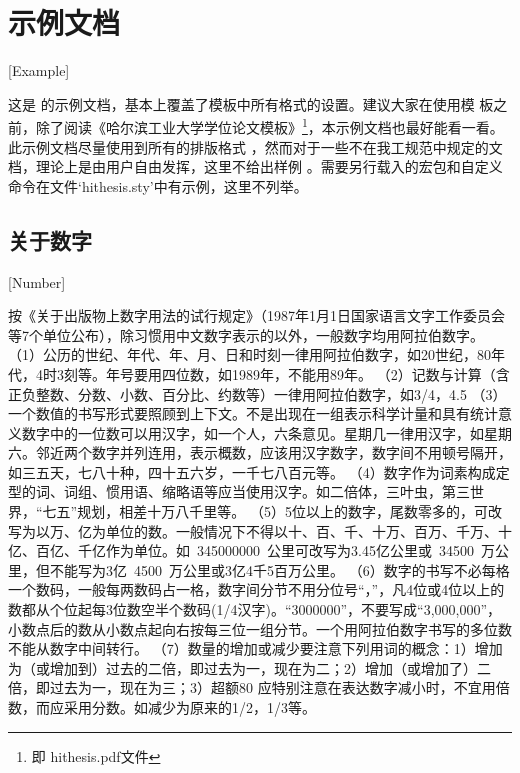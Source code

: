 
\chapter{示例文档}[Example]

这是 \hithesis{}的示例文档，基本上覆盖了模板中所有格式的设置。建议大家在使用模
板之前，除了阅读《\hithesis\:哈尔滨工业大学学位论文模板》\footnote{即
hithesis.pdf文件}，本示例文档也最好能看一看。此示例文档尽量使用到所有的排版格式
，然而对于一些不在我工规范中规定的文档，理论上是由用户自由发挥，这里不给出样例
。需要另行载入的宏包和自定义命令在文件`hithesis.sty'中有示例，这里不列举。

\section{关于数字}[Number]

按《关于出版物上数字用法的试行规定》（1987年1月1日国家语言文字工作委员会等7个单位公布），除习惯用中文数字表示的以外，一般数字均用阿拉伯数字。
（1）公历的世纪、年代、年、月、日和时刻一律用阿拉伯数字，如20世纪，80年代，4时3刻等。年号要用四位数，如1989年，不能用89年。
（2）记数与计算（含正负整数、分数、小数、百分比、约数等）一律用阿拉伯数字，如3/4，4.5%
（3）一个数值的书写形式要照顾到上下文。不是出现在一组表示科学计量和具有统计意义数字中的一位数可以用汉字，如一个人，六条意见。星期几一律用汉字，如星期六。邻近两个数字并列连用，表示概数，应该用汉字数字，数字间不用顿号隔开，如三五天，七八十种，四十五六岁，一千七八百元等。
（4）数字作为词素构成定型的词、词组、惯用语、缩略语等应当使用汉字。如二倍体，三叶虫，第三世界，“七五”规划，相差十万八千里等。
（5）5位以上的数字，尾数零多的，可改写为以万、亿为单位的数。一般情况下不得以十、百、千、十万、百万、千万、十亿、百亿、千亿作为单位。如~\num{345000000}~公里可改写为3.45亿公里或~\num{34500}~万公里，但不能写为3亿~\num{4500}~万公里或3亿4千5百万公里。
（6）数字的书写不必每格一个数码，一般每两数码占一格，数字间分节不用分位号“，”，凡4位或4位以上的数都从个位起每3位数空半个数码(1/4汉字)。“\num{3000000}”，不要写成“3,000,000”，小数点后的数从小数点起向右按每三位一组分节。一个用阿拉伯数字书写的多位数不能从数字中间转行。
（7）数量的增加或减少要注意下列用词的概念：1）增加为（或增加到）过去的二倍，即过去为一，现在为二；2）增加（或增加了）二倍，即过去为一，现在为三；3）超额80%
应特别注意在表达数字减小时，不宜用倍数，而应采用分数。如减少为原来的1/2，1/3等。



